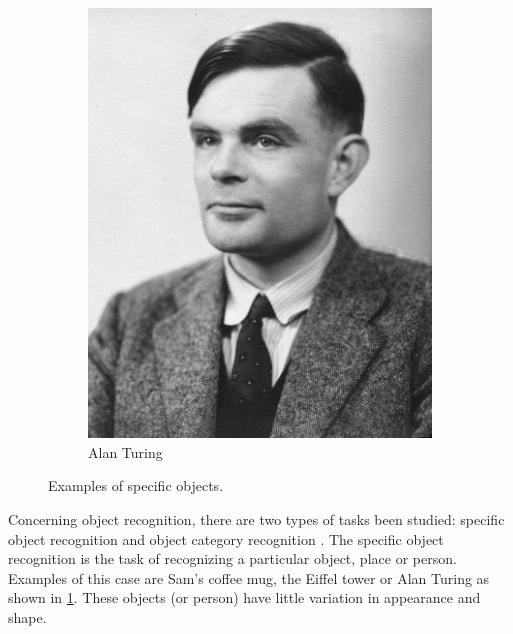 \documentclass[12pt,final,twoside]{report}
\theoremstyle{plain}
\theoremstyle{definition}
\theoremstyle{remark}
\begin{document}
\begin{figure}[tbhp]
\begin{subfigure}[b]{.3\textwidth}
    \includegraphics[width=\textwidth]{turing}
    \caption{Alan Turing}
  \end{subfigure}
  \caption{Examples of specific objects.}
  \label{fig:specific}
\end{figure}

Concerning object recognition, there are two types of tasks been studied: specific object recognition and object category recognition \cite{grauman_visual_2011}. The specific object recognition is the task of recognizing a particular object, place or person. Examples of this case are Sam's coffee mug, the Eiffel tower or Alan Turing as shown in \cref{fig:specific}. These objects (or person) have little variation in appearance and shape. 
\end{document}
